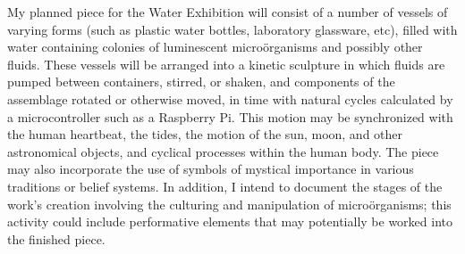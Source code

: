 \documentclass[a4paper,nobib]{tufte-handout}
\begin{document}
My planned piece for the Water Exhibition will consist of a number of vessels of varying forms (such as plastic water bottles, laboratory glassware, etc), filled with water containing colonies of luminescent micro{\"o}rganisms and possibly other fluids. These vessels will be arranged into a kinetic sculpture in which fluids are pumped between containers, stirred, or shaken, and components of the assemblage rotated or otherwise moved, in time with natural cycles calculated by a microcontroller such as a Raspberry Pi. This motion may be synchronized with the human heartbeat, the tides, the motion of the sun, moon, and other astronomical objects, and cyclical processes within the human body. The piece may also incorporate the use of symbols of mystical importance in various traditions or belief systems. In addition, I intend to document the stages of the work's creation involving the culturing and manipulation of micro{\"o}rganisms; this activity could include performative elements that may potentially be worked into the finished piece.

\pagebreak
\begingroup
\singlespacing
\setlength{\emergencystretch}{1.5em} %
\printbibliography
\endgroup
\end{document}
